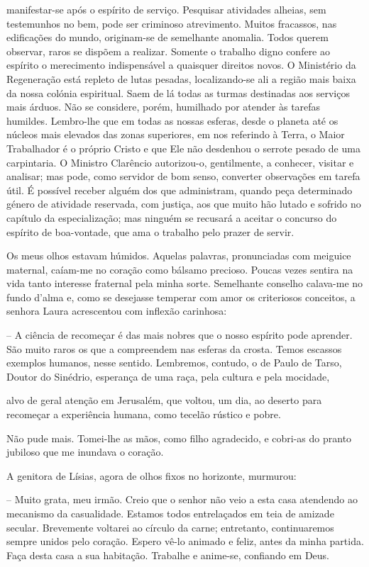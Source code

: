 \documentclass[portuguese,12pt,a4paper]{scrbook}
\begin{document}
	
	manifestar-se após o espírito de serviço. Pesquisar atividades alheias, sem testemunhos no bem, pode ser criminoso atrevimento. Muitos fracassos, nas edificações do mundo, originam-se de semelhante anomalia. Todos querem observar, raros se dispõem a realizar. Somente o trabalho digno confere ao espírito o merecimento indispensável a quaisquer direitos novos. O Ministério da Regeneração está repleto de lutas pesadas, localizando-se ali a região mais baixa da nossa colónia espiritual. Saem de lá todas as turmas destinadas aos serviços mais árduos. Não se considere, porém, humilhado por atender às tarefas humildes. Lembro-lhe que em todas as nossas esferas, desde o planeta até os núcleos mais elevados das zonas superiores, em nos referindo à Terra, o Maior Trabalhador é o próprio Cristo e que Ele não desdenhou o serrote pesado de uma carpintaria. O Ministro Clarêncio autorizou-o, gentilmente, a conhecer, visitar e analisar; mas pode, como servidor de bom senso, converter observações em tarefa útil. É possível receber alguém dos que administram, quando peça determinado género de atividade reservada, com justiça, aos que muito hão lutado e sofrido no capítulo da especialização; mas ninguém se recusará a aceitar o concurso do espírito de boa-vontade, que ama o trabalho pelo prazer de servir.
	
	Os meus olhos estavam húmidos. Aquelas palavras, pronunciadas com meiguice maternal, caíam-me no coração como bálsamo precioso. Poucas vezes sentira na vida tanto interesse fraternal pela minha sorte. Semelhante conselho calava-me no fundo d'alma e, como se desejasse temperar com amor os criteriosos conceitos, a senhora Laura acrescentou com inflexão carinhosa:
	
	– A ciência de recomeçar é das mais nobres que o nosso espírito pode aprender. São muito raros os que a compreendem nas esferas da crosta. Temos escassos exemplos humanos, nesse sentido. Lembremos, contudo, o de Paulo de Tarso, Doutor do Sinédrio, esperança de uma raça, pela cultura e pela mocidade,
	
	
	alvo de geral atenção em Jerusalém, que voltou, um dia, ao deserto para recomeçar a experiência humana, como tecelão rústico e pobre.
	
	Não pude mais. Tomei-lhe as mãos, como filho agradecido, e cobri-as do pranto jubiloso que me inundava o coração.
	
	A genitora de Lísias, agora de olhos fixos no horizonte, murmurou:
	
	– Muito grata, meu irmão. Creio que o senhor não veio a esta casa atendendo ao mecanismo da casualidade. Estamos todos entrelaçados em teia de amizade secular. Brevemente voltarei ao círculo da carne; entretanto, continuaremos sempre unidos pelo coração. Espero vê-lo animado e feliz, antes da minha partida. Faça desta casa a sua habitação. Trabalhe e anime-se, confiando em Deus.
	
\end{document}
